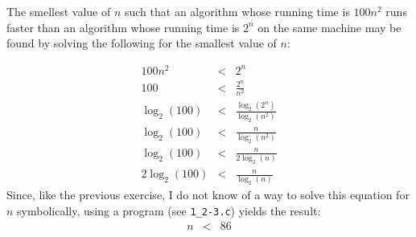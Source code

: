 The smellest value of $n$ such that an algorithm whose running time is $100n^2$ runs faster than an algorithm whose running time is $2^n$ on the same machine may be found by solving the following for the smallest value of $n$:

\begin{eqnarray*}
	100n^2 & < & 2^n \\
	100 & < & \frac{2^n}{n^2} \\
	\log_2(100) & < & \frac{\log_2(2^n)}{\log_2(n^2)} \\
	\log_2(100) & < & \frac{n}{\log_2(n^2)} \\
	\log_2(100) & < & \frac{n}{2\log_2(n)} \\
	2\log_2(100) & < & \frac{n}{\log_2(n)}
\end{eqnarray*}
Since, like the previous exercise, I do not know of a way to solve this equation for $n$ symbolically, using a program (see \texttt{1\_2-3.c}) yields the result:
\begin{eqnarray*}
	n & < & 86
\end{eqnarray*}
